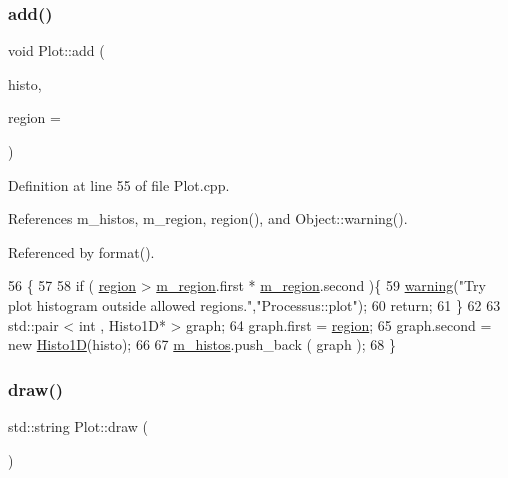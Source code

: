 \subsubsection{\texorpdfstring{add()}{add()}}
{\footnotesize\ttfamily void Plot\+::add (\begin{DoxyParamCaption}\item[{T\+H1D $\ast$}]{histo,  }\item[{unsigned int}]{region = {} }\end{DoxyParamCaption})}



Definition at line 55 of file Plot.\+cpp.



References m\+\_\+histos, m\+\_\+region, region(), and Object\+::warning().



Referenced by format().


\begin{DoxyCode}
56                                        \{
57   
58   \textcolor{keywordflow}{if} ( \hyperlink{classPlot_ae493b21749049d75cbb7282b1e1b9ab4}{region} > \hyperlink{classPlot_aabcbba1cfc66babcbcd647fdf90cdbf1}{m\_region}.first * \hyperlink{classPlot_aabcbba1cfc66babcbcd647fdf90cdbf1}{m\_region}.second )\{
59     \hyperlink{classObject_a65cd4fda577711660821fd2cd5a3b4c9}{warning}(\textcolor{stringliteral}{"Try plot histogram outside allowed regions."},\textcolor{stringliteral}{"Processus::plot"});
60     \textcolor{keywordflow}{return};
61   \}
62 
63   std::pair < int , Histo1D* > graph;
64   graph.first = \hyperlink{classPlot_ae493b21749049d75cbb7282b1e1b9ab4}{region};
65   graph.second = \textcolor{keyword}{new} \hyperlink{classHisto1D}{Histo1D}(histo);
66 
67   \hyperlink{classPlot_a7edebf2b275223b8ce55f6ef3b2da0cc}{m\_histos}.push\_back ( graph );  
68 \}
\end{DoxyCode}
\mbox{\label{classPlot_aa49856f69c852f7f0ba65ed6131b7b61}} 
\subsubsection{\texorpdfstring{draw()}{draw()}}
{\footnotesize\ttfamily std\+::string Plot\+::draw (\begin{DoxyParamCaption}{ }\end{DoxyParamCaption})\hspace{0.3cm}{\ttfamily [inline]}}



